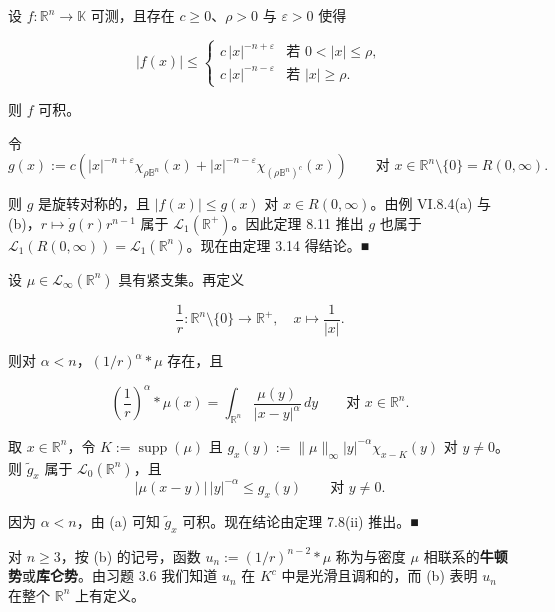 \begin{example}

\begin{items}
\item

设 $ f: \mathbb{R}^{n} \to \mathbb{K} $ 可测，且存在 $ c \ge 0 $、$ \rho > 0 $ 与 $ \varepsilon > 0 $ 使得

\begin{equation*}
|f(x)| \le \begin{cases} c\,|x|^{-n+\varepsilon} & \text{若 } 0 < |x| \le \rho, \\ c\,|x|^{-n-\varepsilon} & \text{若 } |x| \ge \rho. \end{cases}
\end{equation*}

则 $ f $ 可积。

\proofhead
令
\[
g(x) := c\left( |x|^{-n+\varepsilon}\chi_{\rho\mathbb{B}^{n}}(x) + |x|^{-n-\varepsilon}\chi_{(\rho\mathbb{B}^{n})^{c}}(x) \right) \qquad \text{对 } x \in \mathbb{R}^{n}\setminus\{0\} = R(0, \infty).
\]

则 $ g $ 是旋转对称的，且 $ |f(x)| \le g(x) $ 对 $ x \in R(0, \infty) $。由例 VI.8.4(a) 与 (b)，$ r \mapsto \dot{g}(r)r^{n-1} $ 属于 $ \mathcal{L}_{1}(\mathbb{R}^{+}) $。因此定理 8.11 推出 $ g $ 也属于 $ \mathcal{L}_{1}(R(0, \infty)) = \mathcal{L}_{1}(\mathbb{R}^{n}) $。现在由定理 3.14 得结论。\nobreak\hspace{0.35em}■

\item

设 $ \mu \in \mathcal{L}_{\infty}(\mathbb{R}^{n}) $ 具有紧支集。再定义

\[
\frac{1}{r}: \mathbb{R}^{n}\setminus\{0\} \to \mathbb{R}^{+}, \quad x \mapsto \frac{1}{|x|}.
\]

则对 $ \alpha < n $，$ (1/r)^{\alpha}*\mu $ 存在，且

\[
\left( \frac{1}{r} \right)^{\alpha}*\mu(x) = \int_{\mathbb{R}^{n}} \frac{\mu(y)}{|x - y|^{\alpha}}\, dy \qquad \text{对 } x \in \mathbb{R}^{n}.
\]

\proofhead
取 $ x \in \mathbb{R}^{n} $，令 $ K := \operatorname{supp}(\mu) $ 且 $ g_{x}(y) := \|\mu\|_{\infty}|y|^{-\alpha}\chi_{x-K}(y) $ 对 $ y \ne 0 $。则 $ \widetilde{g}_{x} $ 属于 $ \mathcal{L}_{0}(\mathbb{R}^{n}) $，且
\[
|\mu(x - y)|\,|y|^{-\alpha} \le g_{x}(y) \qquad \text{对 } y \ne 0.
\]

因为 $ \alpha < n $，由 (a) 可知 $ \widetilde{g}_{x} $ 可积。现在结论由定理 7.8(ii) 推出。\nobreak\hspace{0.35em}■

\end{items}

对 $ n \ge 3 $，按 (b) 的记号，函数 $ u_{n} := (1/r)^{n-2}*\mu $ 称为与密度 $ \mu $ 相联系的\textbf{牛顿势}或\textbf{库仑势}。由习题 3.6 我们知道 $ u_{n} $ 在 $ K^{c} $ 中是光滑且调和的，而 (b) 表明 $ u_{n} $ 在整个 $ \mathbb{R}^{n} $ 上有定义。

\end{example}

